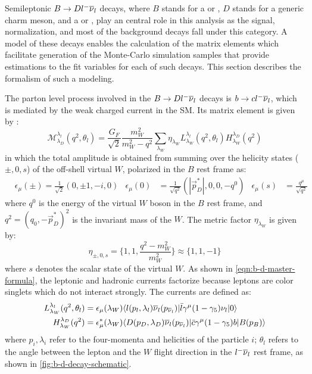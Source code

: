 Semileptonic $B \rightarrow D {l^-}{{\overline{\nu}}_l}$ decays,
where $B$ stands for a \Bzb or \Bm,
$D$ stands for a generic charm meson, and \ellm a \mun or \taum,
play an central role in this analysis as the signal, normalization,
and most of the background decays fall under this category.
A model of these decays enables the calculation of the matrix elements which
facilitate generation of the Monte-Carlo simulation samples that provide
estimations to the fit variables for each of such decays.
This section describes the formalism of such a modeling.

The parton level process involved in the $B \rightarrow D {l^-}{{\overline{\nu}}_l}$ decays is
$b \rightarrow c {l^-}{{\overline{\nu}}_l}$,
which is mediated by the weak charged current in the SM.
Its matrix element is given by \cite{Tanaka_1995}:
\begin{equation}
    \mathcal{M}^{\lambda_l}_{\lambda_D}(q^2, \theta_l) =
    \frac{G_F}{\sqrt{2}} \frac{m^2_W}{m^2_W - q^2}
    \sum_{\lambda_W} \eta_{\lambda_W}
    L^{\lambda_l}_{\lambda_W}(q^2, \theta_l)
    H^{\lambda_D}_{\lambda_W}(q^2)
    \label{eqn:b-d-master-formula}
\end{equation}
in which the total amplitude is obtained from summing over the helicity states
($\pm,0,s$)
of the off-shell virtual $W$,
polarized in the $B$ rest frame as:
\begin{align}
    & \epsilon_\mu(\pm) = \frac{1}{\sqrt{2}}(0, \pm1, -i, 0)
    & \epsilon_\mu(0) &= \frac{1}{\sqrt{q^2}}(|\vec{p}^*_D|, 0, 0, -q^0)
    & \epsilon_\mu(s) &= \frac{q^\mu}{\sqrt{q^2}}
\end{align}
where $q^0$ is the energy of the virtual $W$ boson in the $B$ rest frame,
and $q^2 = (q_0, -\vec{p}^*_D)^2$ is the invariant mass of the $W$.
The metric factor $\eta_{\lambda_W}$ is given by:
\begin{equation}
    \eta_{\pm,0,s} = \{1, 1, \frac{q^2 - m_W^2}{m_W^2}\} \approx \{1, 1, -1\}
\end{equation}
where $s$ denotes the scalar state of the virtual $W$.
As shown in \cref{eqn:b-d-master-formula},
the leptonic and hadronic currents factorize because leptons
are color singlets which do not interact strongly.
The currents are defined as:
\begin{align}
    L^{\lambda_l}_{\lambda_W}(q^2, \theta_l)
    & =
    \epsilon_\mu(\lambda_W)
    \langle l(p_l, \lambda_l) {{\overline{\nu}}_l}(p_{{\overline{\nu}}_l})\rvert \bar{l} \gamma^\mu (1 - \gamma_5) {{\nu}_l}
    \lvert0\rangle \\
    H^{\lambda_D}_{\lambda_W}(q^2)
    & =
    \epsilon^*_\mu(\lambda_W)
    \langle D(p_D, \lambda_D) {{\overline{\nu}}_l}(p_{{\overline{\nu}}_l})\rvert \bar{c} \gamma^\mu (1 - \gamma_5) b
    \lvert B(p_B)\rangle
\end{align}
where $p_i, \lambda_i$ refer to the four-momenta and helicities of the particle
$i$;
$\theta_l$ refers to the angle between the lepton and the $W$ flight direction
in the ${l^-}{{\overline{\nu}}_l}$ rest frame,
as shown in \cref{fig:b-d-decay-schematic}.

